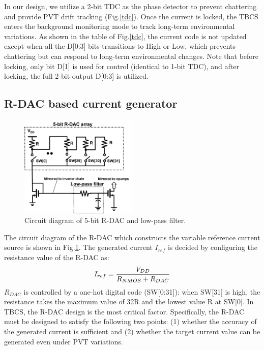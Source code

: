 \documentclass[paper]{ieice}
\begin{document}
In our design, we utilize a 2-bit TDC as the phase detector to prevent chattering and  provide PVT drift tracking (Fig.\ref{tdc}).
Once the current is locked, the TBCS enters the background monitoring mode to track long-term environmental variations.  As shown in the table of Fig.\ref{tdc}, the current code is not updated except when all the D[0:3] bits transitions to High or Low, which prevents chattering but can respond to long-term environmental changes. Note that before locking, only bit D[1] is used for control (identical to 1-bit TDC), and after locking, the full 2-bit output D[0:3] is utilized.

\subsection{R-DAC based current generator}
\begin{figure}[!t]
\centering
 \includegraphics[width=0.5\textwidth]{figs/rdac.png}
  \caption{Circuit diagram of 5-bit R-DAC and low-pass filter.}
\label{rdac_sche}
\end{figure}

\qquad The circuit diagram of the R-DAC which constructs the variable reference current source is shown in Fig.\ref{rdac_sche}. The generated current $I_{ref}$ is decided by configuring the resistance value of the R-DAC as:
\begin{eqnarray}
    \centering
     I_{ref} = \frac{V_{DD}}{R_{NMOS}+R_{DAC}}
    \label{iref_eq}
\end{eqnarray}
$R_{DAC}$ is controlled by a one-hot digital code (SW[0:31]): when SW[31] is high, the resistance takes the maximum value of 32R and the lowest value R at SW[0]. In TBCS, the R-DAC design is the most critical factor. Specifically, the R-DAC must be designed to satisfy the following two points: (1) whether the accuracy of the generated current is sufficient and (2) whether the target current value can be generated even under PVT variations.
\end{document}
